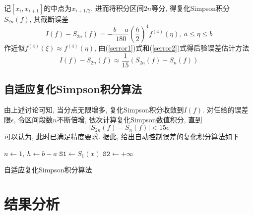 \documentclass{nedsart}
\begin{document}
记$[x_i,x_{i+1}]$的中点为$x_{i+1/2}$, 进而将积分区间$2n$等分, 得复化Simpson积分$S_{2n}(f)$, 其截断误差
\begin{equation}
    \label{serror2}
    I(f)-S_{2n}(f) = -\frac{b-a}{180} \left(\frac{h}{2}\right)^4 f^{(4)}(\eta ),\ a \leq \eta \leq b
\end{equation}
作近似$f^{(4)}(\xi ) \approx f^{(4)}(\eta )$, 由(\ref{serror1})式和(\ref{serror2})式得后验误差估计方法
\begin{equation}
    I(f)-S_{2n}(f) \approx \frac{1}{15}(S_{2n}(f)-S_n(f))
\end{equation}

\subsection{自适应复化Simpson积分算法}

由上述讨论可知, 当分点无限增多, 复化Simpson积分收敛到$I(f)$. 对任给的误差限$\epsilon$, 令区间段数$n$不断倍增, 依次计算复化Simpson数值积分, 直到
\begin{equation}
    |S_{2n}(f)-S_n(f)| < 15\epsilon
\end{equation}
可以认为, 此时已满足精度要求. 据此, 给出自动控制误差的复化积分算法如下

\begin{algorithm}[H]
    
    $n \leftarrow 1, \ h \leftarrow b-a$\;
    $\mathtt{S1} \leftarrow S_1(x)$
    $\mathtt{S2} \leftarrow +\infty$\;

    \caption{自适应复化Simpson积分算法}
\end{algorithm}

\section{结果分析}
\end{document}
